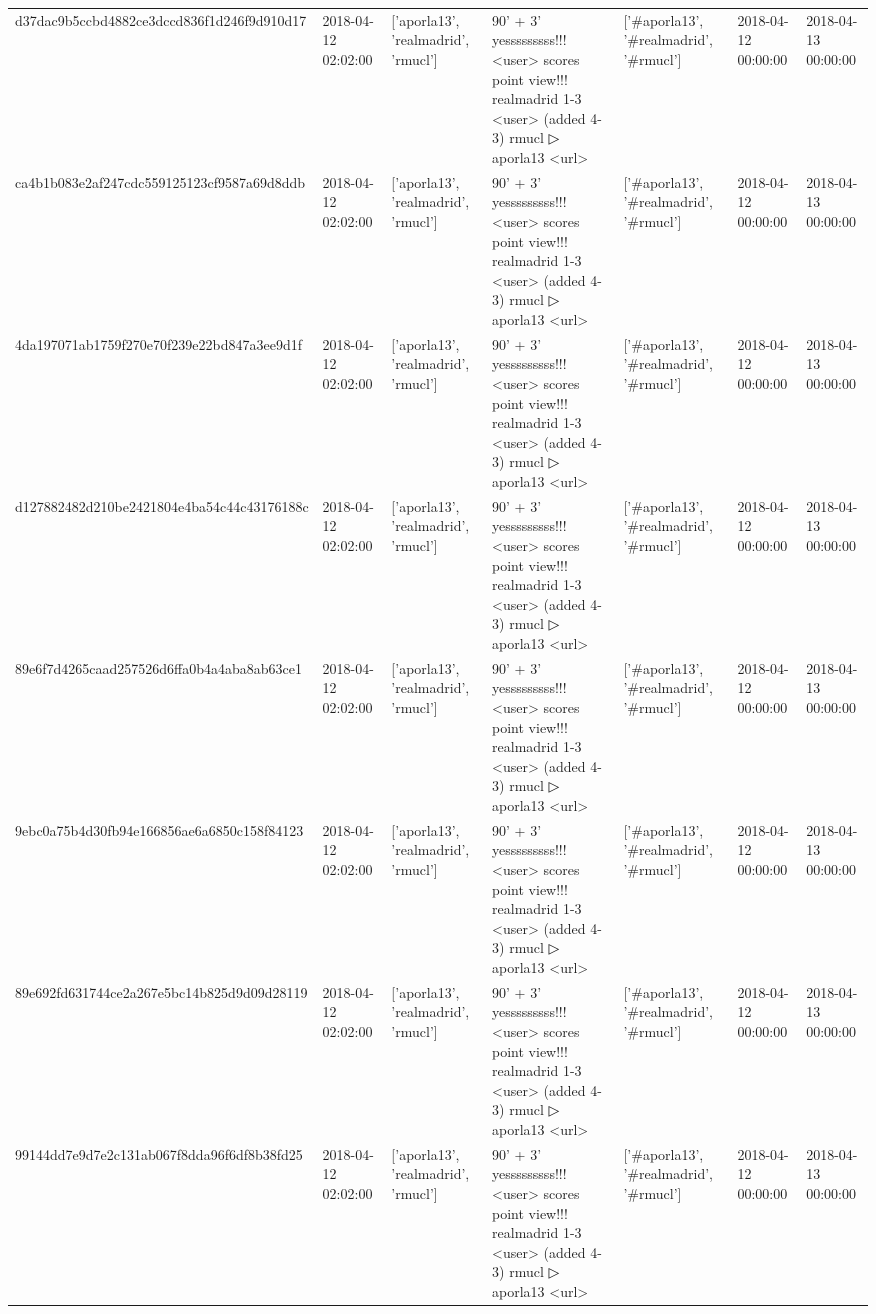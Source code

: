 \begin{tabular}{lllllll}
d37dac9b5ccbd4882ce3dccd836f1d246f9d910d17 & 2018-04-12 02:02:00 & ['aporla13', 'realmadrid', 'rmucl'] & 90' + 3' yesssssssss!!! <user> scores point view!!! realmadrid 1-3 <user> (added 4-3) rmucl ▷ aporla13 <url> & ['#aporla13', '#realmadrid', '#rmucl'] & 2018-04-12 00:00:00 & 2018-04-13 00:00:00 \\
ca4b1b083e2af247cdc559125123cf9587a69d8ddb & 2018-04-12 02:02:00 & ['aporla13', 'realmadrid', 'rmucl'] & 90' + 3' yesssssssss!!! <user> scores point view!!! realmadrid 1-3 <user> (added 4-3) rmucl ▷ aporla13 <url> & ['#aporla13', '#realmadrid', '#rmucl'] & 2018-04-12 00:00:00 & 2018-04-13 00:00:00 \\
4da197071ab1759f270e70f239e22bd847a3ee9d1f & 2018-04-12 02:02:00 & ['aporla13', 'realmadrid', 'rmucl'] & 90' + 3' yesssssssss!!! <user> scores point view!!! realmadrid 1-3 <user> (added 4-3) rmucl ▷ aporla13 <url> & ['#aporla13', '#realmadrid', '#rmucl'] & 2018-04-12 00:00:00 & 2018-04-13 00:00:00 \\
d127882482d210be2421804e4ba54c44c43176188c & 2018-04-12 02:02:00 & ['aporla13', 'realmadrid', 'rmucl'] & 90' + 3' yesssssssss!!! <user> scores point view!!! realmadrid 1-3 <user> (added 4-3) rmucl ▷ aporla13 <url> & ['#aporla13', '#realmadrid', '#rmucl'] & 2018-04-12 00:00:00 & 2018-04-13 00:00:00 \\
89e6f7d4265caad257526d6ffa0b4a4aba8ab63ce1 & 2018-04-12 02:02:00 & ['aporla13', 'realmadrid', 'rmucl'] & 90' + 3' yesssssssss!!! <user> scores point view!!! realmadrid 1-3 <user> (added 4-3) rmucl ▷ aporla13 <url> & ['#aporla13', '#realmadrid', '#rmucl'] & 2018-04-12 00:00:00 & 2018-04-13 00:00:00 \\
9ebc0a75b4d30fb94e166856ae6a6850c158f84123 & 2018-04-12 02:02:00 & ['aporla13', 'realmadrid', 'rmucl'] & 90' + 3' yesssssssss!!! <user> scores point view!!! realmadrid 1-3 <user> (added 4-3) rmucl ▷ aporla13 <url> & ['#aporla13', '#realmadrid', '#rmucl'] & 2018-04-12 00:00:00 & 2018-04-13 00:00:00 \\
89e692fd631744ce2a267e5bc14b825d9d09d28119 & 2018-04-12 02:02:00 & ['aporla13', 'realmadrid', 'rmucl'] & 90' + 3' yesssssssss!!! <user> scores point view!!! realmadrid 1-3 <user> (added 4-3) rmucl ▷ aporla13 <url> & ['#aporla13', '#realmadrid', '#rmucl'] & 2018-04-12 00:00:00 & 2018-04-13 00:00:00 \\
99144dd7e9d7e2c131ab067f8dda96f6df8b38fd25 & 2018-04-12 02:02:00 & ['aporla13', 'realmadrid', 'rmucl'] & 90' + 3' yesssssssss!!! <user> scores point view!!! realmadrid 1-3 <user> (added 4-3) rmucl ▷ aporla13 <url> & ['#aporla13', '#realmadrid', '#rmucl'] & 2018-04-12 00:00:00 & 2018-04-13 00:00:00 \\

\end{tabular}
